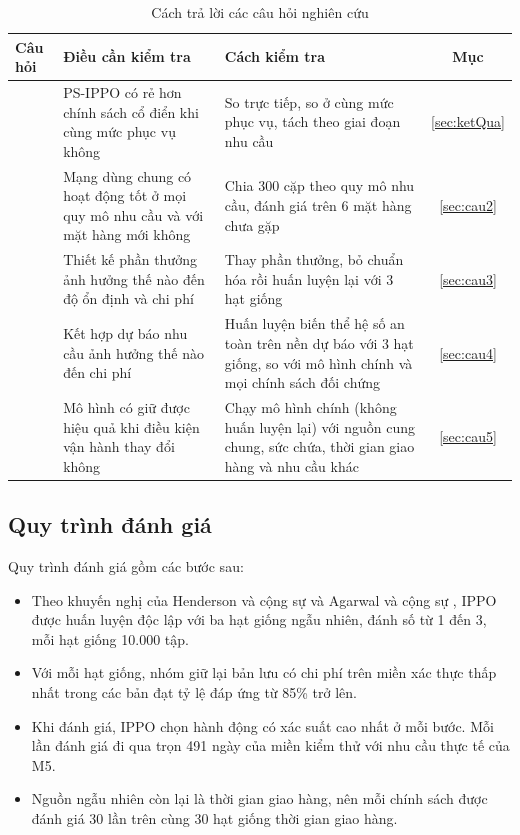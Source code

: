 \begin{table}[H]
    \centering
    \caption{Cách trả lời các câu hỏi nghiên cứu}
    \label{tab:cauHoiThiNghiem}
    \small
    \begin{tabular}{|>{\raggedright\arraybackslash}p{1.6cm}|>{\raggedright\arraybackslash}p{5.2cm}|>{\raggedright\arraybackslash}p{5.2cm}|c|}
        \hline
        Câu hỏi & Điều cần kiểm tra & Cách kiểm tra & Mục \\
        \hline
        1 & PS-IPPO có rẻ hơn chính sách cổ điển khi cùng mức phục vụ không & So trực tiếp, so ở cùng mức phục vụ, tách theo giai đoạn nhu cầu & \ref{sec:ketQua} \\ \hline
        2 & Mạng dùng chung có hoạt động tốt ở mọi quy mô nhu cầu và với mặt hàng mới không & Chia 300 cặp theo quy mô nhu cầu, đánh giá trên 6 mặt hàng chưa gặp & \ref{sec:cau2} \\ \hline
        3 & Thiết kế phần thưởng ảnh hưởng thế nào đến độ ổn định và chi phí & Thay phần thưởng, bỏ chuẩn hóa rồi huấn luyện lại với 3 hạt giống & \ref{sec:cau3} \\ \hline
        4 & Kết hợp dự báo nhu cầu ảnh hưởng thế nào đến chi phí & Huấn luyện biến thể hệ số an toàn trên nền dự báo với 3 hạt giống, so với mô hình chính và mọi chính sách đối chứng & \ref{sec:cau4} \\ \hline
        5 & Mô hình có giữ được hiệu quả khi điều kiện vận hành thay đổi không & Chạy mô hình chính (không huấn luyện lại) với nguồn cung chung, sức chứa, thời gian giao hàng và nhu cầu khác & \ref{sec:cau5} \\
        \hline
    \end{tabular}
\end{table}

\subsection{Quy trình đánh giá}
\label{subsec:daHatGiong}

Quy trình đánh giá gồm các bước sau:
\begin{itemize}
    \item Theo khuyến nghị của Henderson và cộng sự \cite{henderson2018} và Agarwal và cộng sự \cite{agarwal2021}, IPPO được huấn luyện độc lập với ba hạt giống ngẫu nhiên, đánh số từ 1 đến 3, mỗi hạt giống 10.000 tập.
    \item Với mỗi hạt giống, nhóm giữ lại bản lưu có chi phí trên miền xác thực thấp nhất trong các bản đạt tỷ lệ đáp ứng từ 85\% trở lên.
    \item Khi đánh giá, IPPO chọn hành động có xác suất cao nhất ở mỗi bước. Mỗi lần đánh giá đi qua trọn 491 ngày của miền kiểm thử với nhu cầu thực tế của M5.
    \item Nguồn ngẫu nhiên còn lại là thời gian giao hàng, nên mỗi chính sách được đánh giá 30 lần trên cùng 30 hạt giống thời gian giao hàng.
\end{itemize}


